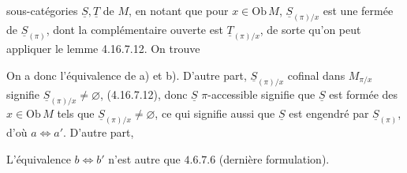 

sous-catégories $\underline S,\underline T$ de $M$, en notant que pour $x\in\mathrm{Ob}\,M$, $\underline S_{(\pi)/x}$ est une  fermée de $\underline S_{(\pi)}$, dont la complémentaire ouverte est $\underline T_{(\pi)/x}$, de sorte qu'on peut appliquer le lemme 4.16.7.12. On trouve


On a donc l'équivalence de a) et b). D'autre part, $\underline S_{(\pi)/x}$ cofinal dans $M_{\pi/x}$ signifie   $\underline S_{(\pi)/x}\ne\varnothing$,  (4.16.7.12), donc  $\underline S$ $\pi$-accessible signifie que $\underline S$ est formée des $x\in\mathrm{Ob}\,M$ tels que $\underline S_{(\pi)/x}\ne\varnothing$, ce qui signifie aussi que $\underline S$ est  engendré par $\underline S_{(\pi)}$, d'où $a\Longleftrightarrow a'$. D'autre part,


L'équivalence $b\Longleftrightarrow b'$ n'est autre que $4.6.7.6$ (dernière formulation).

